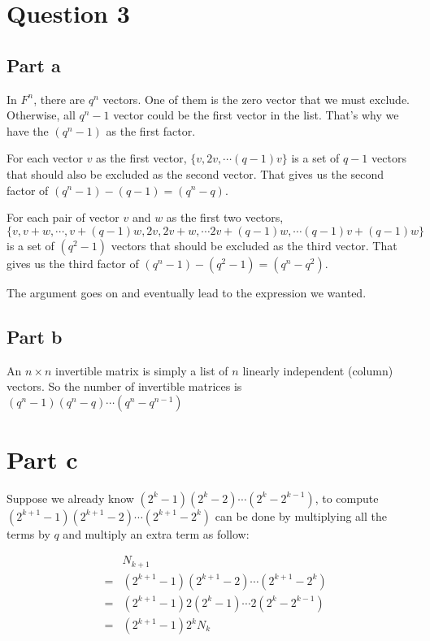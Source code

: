 \section*{Question 3}
\subsection*{Part a}
In $ F^n $, there are $ q^n $ vectors. One of them is the zero vector that we must exclude. Otherwise, all $ q^n - 1 $ vector could be the first vector in the list. That's why we have the $ (q^n - 1) $ as the first factor.

For each vector $ v $ as the first vector, $ \{ v, 2v, \cdots (q-1)v \} $ is a set of $ q - 1 $ vectors that should also be excluded as the second vector. That gives us the second factor of $ (q^n - 1) - (q - 1) = (q^n - q) $.

For each pair of vector $ v $ and $ w $ as the first two vectors, $ \{ v, v + w, \cdots, v + (q-1)w, 2v, 2v + w, \cdots 2v + (q-1)w, \cdots (q-1)v + (q-1)w \} $ is a set of $ (q^2 - 1) $ vectors that should be excluded as the third vector. That gives us the third factor of $ (q^n - 1) - (q^2 - 1) = (q^n - q^2) $.

The argument goes on and eventually lead to the expression we wanted.

\subsection*{Part b}
An $ n \times n $ invertible matrix is simply a list of $ n $ linearly independent (column) vectors. So the number of invertible matrices is $ (q^n - 1)(q^n - q)\cdots(q^n - q^{n-1})$

\section*{Part c}
Suppose we already know $ (2^k - 1)(2^k - 2)\cdots(2^k - 2^{k-1}) $, to compute $ (2^{k+1} - 1)(2^{k+1} - 2)\cdots(2^{k+1} - 2^k) $ can be done by multiplying all the terms by $ q $ and multiply an extra term as follow:

\begin{eqnarray*}
  & & N_{k+1} \\
  &=& (2^{k+1} - 1)(2^{k+1} - 2) \cdots (2^{k+1} - 2^k) \\
  &=& (2^{k+1} - 1)2(2^k - 1) \cdots 2 (2^k - 2^{k-1}) \\
  &=& (2^{k+1} - 1)2^k N_k 
\end{eqnarray*}

